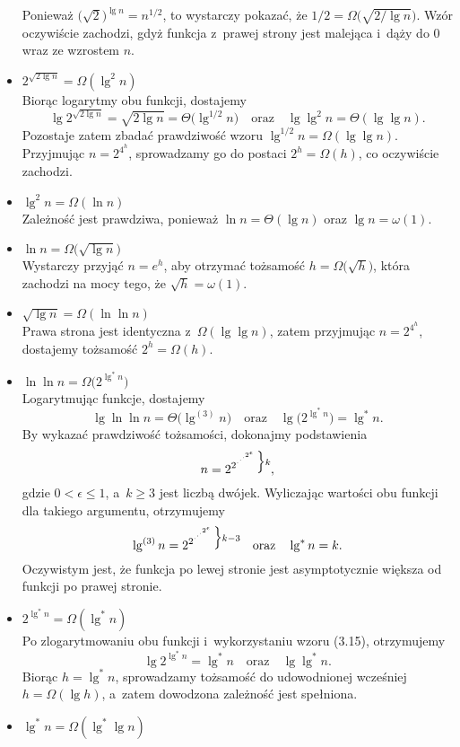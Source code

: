 \begin{itemize}
Ponieważ $\bigl(\!\sqrt{2}\bigr)^{\lg n}=n^{1/2}$, to wystarczy pokazać, że $1/2=\Omega\bigl(\!\sqrt{2/\!\lg n}\bigr)$.
Wzór oczywiście zachodzi, gdyż funkcja z~prawej strony jest malejąca i~dąży do 0 wraz ze wzrostem $n$.
\item $2^{\sqrt{2\lg n}}=\Omega(\lg^2 n)$ \\
	Biorąc logarytmy obu funkcji, dostajemy
	\[
		\lg2^{\sqrt{2\lg n}} = \sqrt{2\lg n} = \Theta\bigl(\lg^{1/2}n\bigr) \quad\text{oraz}\quad \lg\lg^2n = \Theta(\lg\lg n).
	\]
	Pozostaje zatem zbadać prawdziwość wzoru $\lg^{1/2}n=\Omega(\lg\lg n)$.
Przyjmując $n=2^{4^h}$, sprowadzamy go do postaci $2^h=\Omega(h)$, co oczywiście zachodzi.
\item $\lg^2n=\Omega(\ln n)$ \\
	Zależność jest prawdziwa, ponieważ $\ln n=\Theta(\lg n)$ oraz $\lg n=\omega(1)$.
\item $\ln n=\Omega\bigl(\!\sqrt{\lg n}\bigr)$ \\
	Wystarczy przyjąć $n=e^h$, aby otrzymać tożsamość $h=\Omega\bigl(\!\sqrt{h}\bigr)$, która zachodzi na mocy tego, że $\sqrt{h}=\omega(1)$.
\item $\sqrt{\lg n}=\Omega(\ln\ln n)$ \\
	Prawa strona jest identyczna z~$\Omega(\lg\lg n)$, zatem przyjmując $n=2^{4^h}$, dostajemy tożsamość $2^h=\Omega(h)$.
\item $\ln\ln n=\Omega\bigl(2^{\lg^*n}\bigr)$ \\
	Logarytmując funkcje, dostajemy
	\[
		\lg\ln\ln n = \Theta\bigl(\lg^{(3)}n\bigr) \quad\text{oraz}\quad \lg\bigl(2^{\lg^*n}\bigr) = \lg^*n.
	\]
	By wykazać prawdziwość tożsamości, dokonajmy podstawienia
	\[
		n = 2^{2^{\cdot^{\cdot^{\cdot^{2^\epsilon}}}}}\vbox{\hbox{$\Big\}\scriptstyle k$}\kern0pt},
	\]
	gdzie $0<\epsilon\le1$, a~$k\ge3$ jest liczbą dwójek.
Wyliczając wartości obu funkcji dla takiego argumentu, otrzymujemy
	\[
		\lg^{(3)}n = 2^{2^{\cdot^{\cdot^{\cdot^{2^\epsilon}}}}}\vbox{\hbox{$\Big\}\scriptstyle k-3$}\kern0pt} \quad\text{oraz}\quad \lg^*n=k.
	\]
	Oczywistym jest, że funkcja po lewej stronie jest asymptotycznie większa od funkcji po prawej stronie.
\item $2^{\lg^*n}=\Omega(\lg^*n)$ \\
	Po zlogarytmowaniu obu funkcji i~wykorzystaniu wzoru (3.15), otrzymujemy
	\[
		\lg2^{\lg^*n} = \lg^*n \quad\text{oraz}\quad \lg\lg^*n.
	\]
	Biorąc $h=\lg^*n$, sprowadzamy tożsamość do udowodnionej wcześniej $h=\Omega(\lg h)$, a~zatem dowodzona zależność jest spełniona.
\item $\lg^*n=\Omega(\lg^*\lg n)$ \\

\end{itemize}
